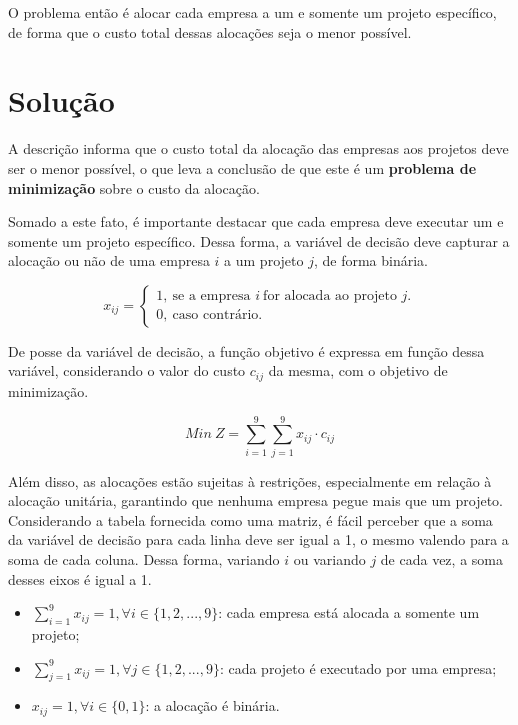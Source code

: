 \documentclass[12pt]{article}
\begin{document}
O problema então é alocar cada empresa a um e somente um projeto específico, de forma que o custo total dessas alocações seja o menor possível.

\section{Solução}

A descrição informa que o custo total da alocação das empresas aos projetos deve ser o menor possível, o que leva a conclusão de que este é um \textbf{problema de minimização} sobre o custo da alocação.

Somado a este fato, é importante destacar que cada empresa deve executar um e somente um projeto específico. Dessa forma, a variável de decisão deve capturar a alocação ou não de uma empresa $i$ a um projeto $j$, de forma binária.

\begin{equation*}
    x_{ij} = 
    \begin{cases}
        1,\ \text{se a empresa } i \ \text{for alocada ao projeto } j\text{.}\\
        0,\ \text{caso contrário.}
    \end{cases}
\end{equation*}

De posse da variável de decisão, a função objetivo é expressa em função dessa variável, considerando o valor do custo $c_{ij}$ da mesma, com o objetivo de minimização.

$$Min\ Z = \sum_{i=1}^{9}\sum_{j=1}^{9} x_{ij} \cdot c_ {ij}$$

Além disso, as alocações estão sujeitas à restrições, especialmente em relação à alocação unitária, garantindo que nenhuma empresa pegue mais que um projeto. Considerando a tabela fornecida como uma matriz, é fácil perceber que a soma da variável de decisão para cada linha deve ser igual a 1, o mesmo valendo para a soma de cada coluna. Dessa forma, variando $i$ ou variando $j$ de cada vez, a soma desses eixos é igual a 1.

\begin{itemize}
    \item $\sum_{i=1}^{9} x_{ij} = 1, \forall i \in \{1,2,...,9\}$: cada empresa está alocada a somente um projeto;
    \item $\sum_{j=1}^{9} x_{ij} = 1, \forall j \in \{1,2,...,9\}$: cada projeto é executado por uma empresa;
    \item $x_{ij} = 1, \forall i \in \{0,1\}$: a alocação é binária.
\end{itemize}
\end{document}
